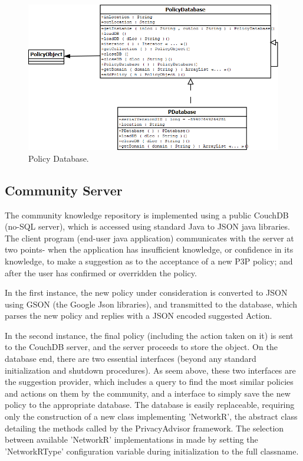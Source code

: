 \begin{figure}[htbp]
\begin{center}
\includegraphics[width = \textwidth]{DesignReport/uml/pd.png}
\caption{Policy Database.}
\label{pd_fig}
\end{center}
\end{figure}



\subsection{Community Server} %
The community knowledge repository is implemented using a public CouchDB (no-SQL server), which is accessed using standard Java to JSON java libraries. The client program (end-user java application) communicates with the server at two points- when the application has insufficient knowledge, or confidence in its knowledge, to make a suggestion as to the acceptance of a new P3P policy; and after the user has confirmed or overridden the policy.

In the first instance, the new policy under consideration is converted to JSON using GSON (the Google Json libraries), and transmitted to the database, which parses the new policy and replies with a JSON encoded suggested Action.

In the second instance, the final policy (including the action taken on it) is sent to the CouchDB server, and the server proceeds to store the object.
On the database end, there are two essential interfaces (beyond any standard initialization and shutdown procedures). As seem above, these two interfaces are the suggestion provider, which includes a query to find the most similar policies and actions on them by the community, and a interface to simply save the new policy to the appropriate database.
The database is easily replaceable, requiring only the construction of a new class implementing 'NetworkR', the abstract class detailing the methods called by the PrivacyAdvisor framework. The selection between available 'NetworkR' implementations in made by setting the 'NetworkRType' configuration variable during initialization to the full classname.
	




